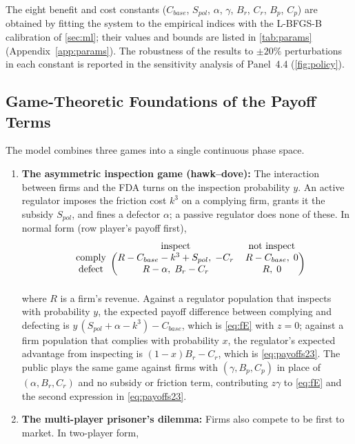 \documentclass[10pt]{article}
\begin{document}
The eight benefit and cost constants ($C_{base}$, $S_{pol}$, $\alpha$, $\gamma$, $B_r$, $C_r$, $B_p$, $C_p$) are obtained by fitting the system to the empirical indices with the L-BFGS-B calibration of \cref{sec:ml}; their values and bounds are listed in \cref{tab:params} (Appendix~\ref{app:params}). The robustness of the results to $\pm 20\%$ perturbations in each constant is reported in the sensitivity analysis of Panel~4.4 (\cref{fig:policy}).

\subsection{Game-Theoretic Foundations of the Payoff Terms}\label{sec:games}
The model combines three games into a single continuous phase space.
\begin{enumerate}
    \item \textbf{The asymmetric inspection game (hawk--dove):} The interaction between firms and the FDA turns on the inspection probability $y$. An active regulator imposes the friction cost $k^3$ on a complying firm, grants it the subsidy $S_{pol}$, and fines a defector $\alpha$; a passive regulator does none of these. In normal form (row player's payoff first),
\begin{equation}
\begin{blockarray}{ccc}
 & \text{inspect} & \text{not inspect} \\
\begin{block}{c(cc)}
 \text{comply} & R-C_{base}-k^3+S_{pol},\;-C_r & R-C_{base},\;0 \\
 \text{defect} & R-\alpha,\;B_r-C_r & R,\;0 \\
\end{block}
\end{blockarray}
\label{eq:payoffinsp}
\end{equation}
where $R$ is a firm's revenue. Against a regulator population that inspects with probability $y$, the expected payoff difference between complying and defecting is $y\,(S_{pol}+\alpha-k^3) - C_{base}$, which is \cref{eq:fE} with $z=0$; against a firm population that complies with probability $x$, the regulator's expected advantage from inspecting is $(1-x)B_r - C_r$, which is \cref{eq:payoffs23}. The public plays the same game against firms with $(\gamma, B_p, C_p)$ in place of $(\alpha, B_r, C_r)$ and no subsidy or friction term, contributing $z\gamma$ to \cref{eq:fE} and the second expression in \cref{eq:payoffs23}.
    \item \textbf{The multi-player prisoner's dilemma:} Firms also compete to be first to market. In two-player form,

\end{enumerate}
\end{document}
